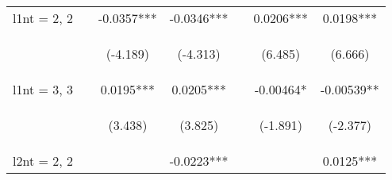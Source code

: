 \documentclass[]{standalone}
\begin{document}
\begin{tabular}{lcccccc}
    l1nt = 2, 2      &                                                & -0.0357***                                     & -0.0346***                                     &                                                & 0.0206***                                      & 0.0198***                                      \\
    \vspace{4pt}     & \begin{footnotesize}\end{footnotesize}         & \begin{footnotesize}(-4.189)\end{footnotesize} & \begin{footnotesize}(-4.313)\end{footnotesize} & \begin{footnotesize}\end{footnotesize}         & \begin{footnotesize}(6.485)\end{footnotesize}  & \begin{footnotesize}(6.666)\end{footnotesize}  \\
    l1nt = 3, 3      &                                                & 0.0195***                                      & 0.0205***                                      &                                                & -0.00464*                                      & -0.00539**                                     \\
    \vspace{4pt}     & \begin{footnotesize}\end{footnotesize}         & \begin{footnotesize}(3.438)\end{footnotesize}  & \begin{footnotesize}(3.825)\end{footnotesize}  & \begin{footnotesize}\end{footnotesize}         & \begin{footnotesize}(-1.891)\end{footnotesize} & \begin{footnotesize}(-2.377)\end{footnotesize} \\
    l2nt = 2, 2      &                                                &                                                & -0.0223***                                     &                                                &                                                & 0.0125***                                      \\

\end{tabular}
\end{document}
